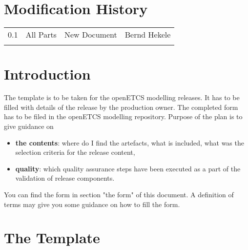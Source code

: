 \documentclass{template/openetcs_article}
\begin{document}
\section*{Modification History}
\begin{supertabular}{| m{1.2cm} | m{1.2cm} | m{6.6cm} | m{4cm} |}
0.1 & All Parts & New Document & Bernd Hekele\\
 & & & \\\hline
\end{supertabular}


\tableofcontents
\listoffiguresandtables
\newpage





\section{Introduction}
The template is to be taken for the openETCS modelling releases. It has to be filled with details of the release by the production owner. The completed form has to be filed in the openETCS modelling repository. Purpose of the plan is to give guidance on\\
\begin{itemize}
\item \textbf{the contents}: where do I find the artefacts, what is included, what was the selection criteria for the release content,
\item \textbf{quality}: which quality assurance steps have been executed as a part of the validation of release components.
\end{itemize}

You can find the form in section "the form" of this document. A definition of terms may give you some guidance on how to fill the form. 

\newpage

\section{The Template}
\end{document}
